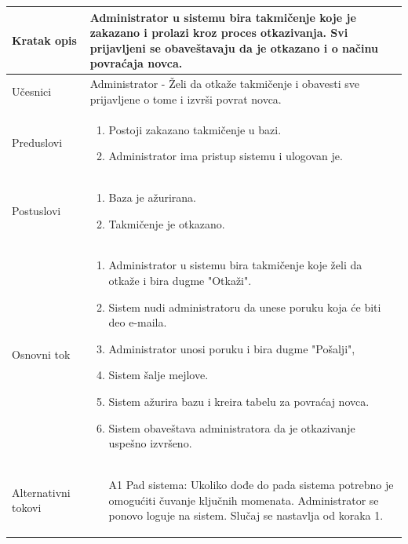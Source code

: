 \documentclass[../../main.tex]{subfiles}
\begin{document}
\begin{longtable}{| p{} | p{} |} 
\hline
    Kratak opis &  Administrator u sistemu bira takmičenje koje je zakazano i prolazi kroz proces otkazivanja. Svi prijavljeni se obaveštavaju da je otkazano i o načinu povraćaja novca.\\ 
\hline    
    Učesnici & Administrator - Želi da otkaže takmičenje i obavesti sve prijavljene o tome i izvrši povrat novca.\\
\hline
   Preduslovi & \begin{enumerate}
       \item Postoji zakazano takmičenje u bazi.
       \item Administrator ima pristup sistemu i ulogovan je.
   \end{enumerate}\\
\hline  
    Postuslovi & \begin{enumerate}
        \item Baza je ažurirana.
        \item Takmičenje je otkazano.
    \end{enumerate}\\
\hline
    Osnovni tok & \begin{enumerate}
        \item Administrator u sistemu bira takmičenje koje želi da otkaže i bira dugme "Otkaži".
        \item Sistem nudi administratoru da unese poruku koja će biti deo e-maila.
        \item Administrator unosi poruku i bira dugme "Pošalji",
        \item Sistem šalje mejlove.
        \item Sistem ažurira bazu i kreira tabelu za povraćaj novca.
        \item Sistem obaveštava administratora da je otkazivanje uspešno izvršeno.
    \end{enumerate}\\
\hline
    Alternativni tokovi & \begin{itemize}
        \item[A1] Pad sistema: Ukoliko dođe do pada sistema potrebno je omogućiti čuvanje ključnih momenata. Administrator se ponovo loguje na sistem. Slučaj se nastavlja od koraka 1.

\end{itemize}
\end{longtable}
\end{document}
